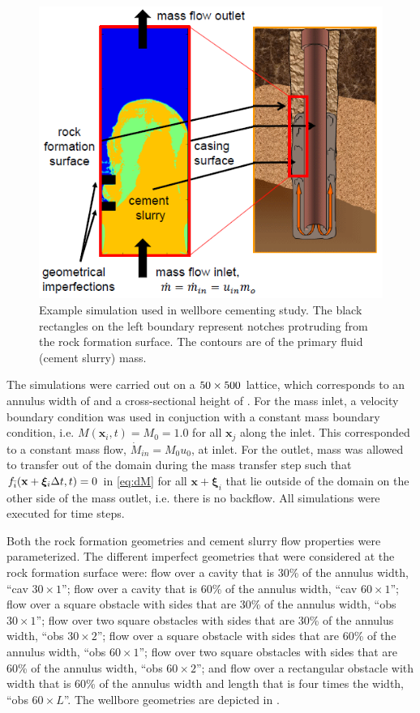 \documentclass[pdftex,ms]{pittetd}
\newcommand{\pos}{\mathbf{x}}
\newcommand{\pvel}{\boldsymbol{\xi}}
\begin{document}
\begin{figure}
\centering
\includegraphics{figs/wellbore-cementing-schematic}
\caption{Example simulation used in wellbore cementing study.
The black rectangles on the left boundary represent notches protruding from the rock formation surface. The contours are of the primary fluid (cement slurry) mass.}
\label{fig:wellbore-cementing-schematic}
\end{figure}

The simulations were carried out on a $50 \times 500$ lattice, which corresponds to an annulus width of \anw \hspace{0.05cm} and a cross-sectional height of \anh.
For the mass inlet, a \citet{zou1997pressure} velocity boundary condition was used in conjuction with a constant mass boundary condition, i.e. $M(\pos_i, t) = M_0 = 1.0$ for all $\pos_j$ along the inlet.
This corresponded to a constant mass flow, $\dot{M}_{in} = M_0 u_0$, at inlet.
For the outlet, mass was allowed to transfer out of the domain during the mass transfer step such that $f_\opidx(\pos + \pvel_i \Delta t, t) = 0$ in \eqref{eq:dM} for all $\pos + \pvel_i$ that lie outside of the domain on the other side of the mass outlet, i.e. there is no backflow.
All simulations were executed for \nsteps time steps.

Both the rock formation geometries and cement slurry flow properties were parameterized.
The different imperfect geometries that were considered at the rock formation surface were: flow over a cavity that is 30\% of the annulus width, ``cav $30 \times 1$''; flow over a cavity that is 60\% of the annulus width, ``cav $60 \times 1$''; flow over a square obstacle with sides that are 30\% of the annulus width, ``obs $30 \times 1$''; flow over two square obstacles with sides that are 30\% of the annulus width, ``obs $30 \times 2$''; flow over a square obstacle with sides that are 60\% of the annulus width, ``obs $60 \times 1$''; flow over two square obstacles with sides that are 60\% of the annulus width, ``obs $60 \times 2$''; and flow over a rectangular obstacle with width that is 60\% of the annulus width and length that is four times the width, ``obs $60 \times L$''.
The wellbore geometries are depicted in .
\end{document}
